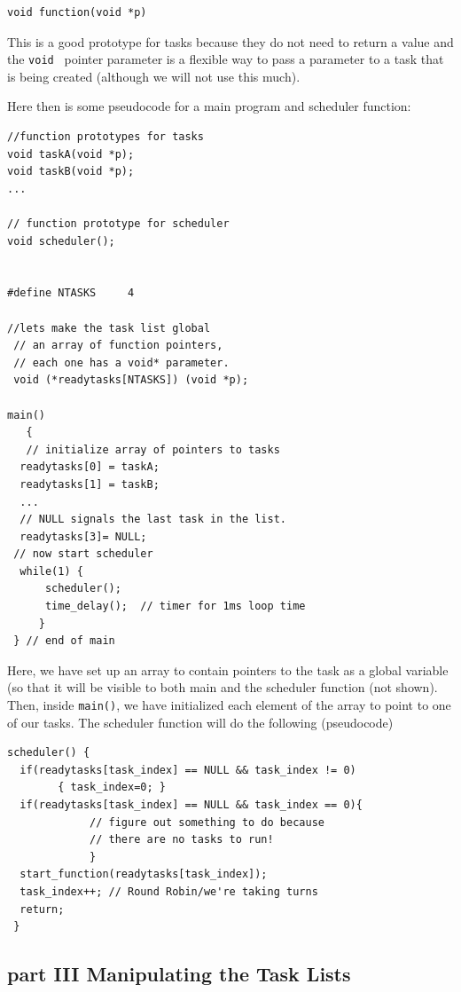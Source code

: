 \documentclass{article}	%
\begin{document}
\begin{verbatim}
void function(void *p)
\end{verbatim}
This is a good prototype for tasks because they do not need to return a value and the  {\tt void } pointer parameter is a flexible way to pass a parameter to a task that is being created (although we will not use this much).
 
Here then is some pseudocode for a main program and scheduler function:
 
\begin{verbatim}
//function prototypes for tasks
void taskA(void *p);
void taskB(void *p);
...

// function prototype for scheduler
void scheduler();


#define NTASKS     4

//lets make the task list global
 // an array of function pointers,
 // each one has a void* parameter.
 void (*readytasks[NTASKS]) (void *p);   

main()
   { 
   // initialize array of pointers to tasks
  readytasks[0] = taskA;
  readytasks[1] = taskB;
  ...
  // NULL signals the last task in the list.
  readytasks[3]= NULL;
 // now start scheduler
  while(1) {
      scheduler();
      time_delay();  // timer for 1ms loop time
     }
 } // end of main
\end{verbatim}


Here, we have set up an array to contain pointers to the task as a global variable (so that it will be visible to both main and the scheduler function (not shown). 
Then, inside {\tt main()}, we have initialized each element of the array to point to one of our tasks.   The scheduler function will do the following (pseudocode)

\begin{verbatim}
scheduler() {
  if(readytasks[task_index] == NULL && task_index != 0) 
        { task_index=0; }
  if(readytasks[task_index] == NULL && task_index == 0){
             // figure out something to do because 
             // there are no tasks to run!
             }
  start_function(readytasks[task_index]);
  task_index++; // Round Robin/we're taking turns
  return;
 }
\end{verbatim}


\subsection{part III  Manipulating the Task Lists}
\end{document}
